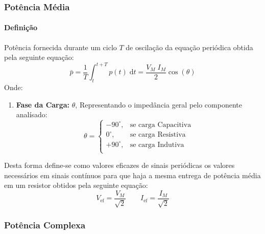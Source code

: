 \documentclass{article}
\begin{document}
        \subsubsection{Potência Média}
            \paragraph{Definição}Potência fornecida durante um ciclo $T$ de oscilação da equação periódica obtida pela seguinte equação:
                \begin{equation}
                    \bar{p} = 
                    \frac{1}{T} \int_{t}^{t+T} p(t)\;\text{d}t = 
                    \boxed{
                        \frac{V_{M}\;I_{M}}{2} \cos(\theta)
                    }
                \end{equation}
            Onde:
                \begin{enumerate}
                    \item \textbf{Fase da Carga:} $\theta$, Representando o impedância geral pelo componente analísado:
                        \begin{equation*}
                            \theta = 
                            \begin{cases}
                                -90^{\circ}, & \text{se carga Capacitiva}\\
                                    0^{\circ}, & \text{se carga Resistiva}\\
                                +90^{\circ}, & \text{se carga Indutiva}\\
                            \end{cases}
                        \end{equation*}
                \end{enumerate}
            Desta forma define-se como valores eficazes de sinais periódicas os valores necessários em sinais contínuos para que haja a mesma entrega de potência média em um resistor obtidos pela seguinte equação:
                \begin{equation}
                    \boxed{V_{\text{ef}} = \frac{V_{M}}{\sqrt{2}}}
                    \qquad
                    \boxed{I_{\text{ef}} = \frac{I_{M}}{\sqrt{2}}}
                \end{equation}

        \subsubsection{Potência Complexa}
\end{document}
